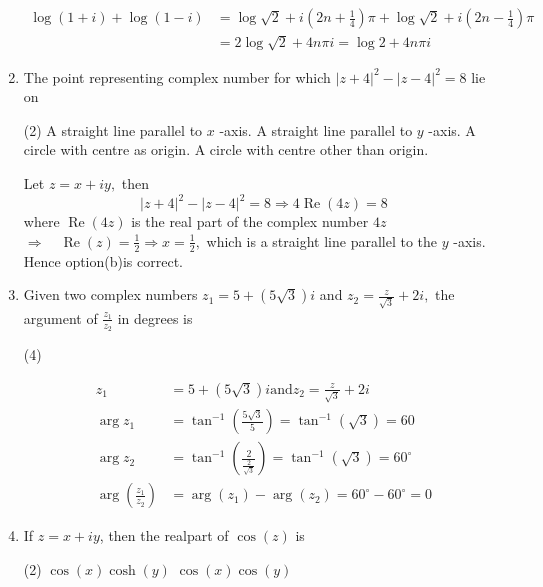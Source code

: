 \begin{enumerate}[label=\color{ocre}\textbf{\arabic*.}]
\begin{answer}
\begin{align*}
		\log (1+i)+\log (1-i) &=\log \sqrt{2}+i\left(2 n+\frac{1}{4}\right) \pi+\log \sqrt{2}+i\left(2 n-\frac{1}{4}\right) \pi \\
		&=2 \log \sqrt{2}+4 n \pi i=\log 2+4 n \pi i
	\end{align*}
\end{answer}
\item The point representing complex number for which $|z+4|^{2}-|z-4|^{2}=8$ lie on
\begin{tasks}(2)
	\task[\textbf{a.}]A straight line parallel to $x$ -axis.  
	\task[\textbf{b.}]A straight line parallel to $y$ -axis.
	\task[\textbf{c.}]A circle with centre as origin. 
	\task[\textbf{d.}]A circle with centre other than origin. 
\end{tasks}
\begin{answer}
	Let $z=x+i y,$ then
	$$
	|z+4|^{2}-|z-4|^{2}=8 \Rightarrow 4 \operatorname{Re}(4 z)=8
	$$
	where $\operatorname{Re}(4 z)$ is the real part of the complex number $4 z$
	\\$\Rightarrow \quad \operatorname{Re}(z)=\frac{1}{2} \Rightarrow x=\frac{1}{2},$ which is a straight line parallel to the $y$ -axis.\\Hence option(b)is correct.
\end{answer}
\item Given two complex numbers $z_{1}=5+(5 \sqrt{3}) i$ and
$z_{2}=\frac{z}{\sqrt{3}}+2 i,$ the argument of $\frac{z_{1}}{z_{2}}$ in degrees is
\begin{tasks}(4)
\end{tasks}
\begin{answer}
	\begin{align*}
	z_{1}&=5+(5 \sqrt{3}) i\text{and} z_{2}=\frac{z}{\sqrt{3}}+2 i\\
	\arg z_{1}&=\tan ^{-1}\left(\frac{5 \sqrt{3}}{5}\right)=\tan ^{-1}(\sqrt{3})=60\\
	\arg z_{2}&=\tan ^{-1}\left(\frac{2}{\frac{2}{\sqrt{3}}}\right)=\tan ^{-1}(\sqrt{3})=60^{\circ}\\
	\arg \left(\frac{z_{1}}{z_{2}}\right)&=\arg \left(z_{1}\right)-\arg \left(z_{2}\right)=60^{\circ}-60^{\circ}=0
	\end{align*}
\end{answer}
\item If $z=x+i y$, then the realpart of $\cos (z)$ is 
\begin{tasks}(2)
	\task[\textbf{a.}]$\cos (x) \cosh (y)$  
	\task[\textbf{b.}]$\cos (x) \cos (y)$

\end{tasks}
\end{enumerate}
